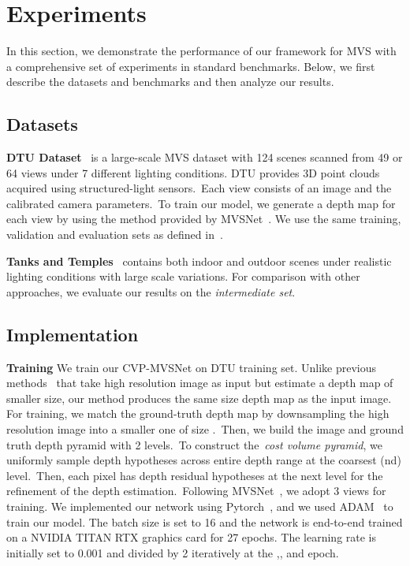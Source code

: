 \section{Experiments}
In this section, we demonstrate the performance of our framework for MVS with a comprehensive set of experiments in standard benchmarks. Below, we first describe the datasets and benchmarks and then analyze our results.
\subsection{Datasets}
 \noindent\textbf{DTU Dataset}~\cite{aanaes2016large} is a large-scale MVS dataset with 124 scenes scanned from 49 or 64 views under 7 different lighting conditions. DTU provides 3D point clouds acquired using structured-light sensors.~Each view consists of an image and the calibrated camera parameters.~To train our model, we generate a  depth map for each view by using the method provided by MVSNet~\cite{yao2018mvsnet}. We use the same training, validation and evaluation sets as defined in~\cite{yao2018mvsnet,yao2019recurrent}.
 
 \noindent\textbf{Tanks and Temples}~\cite{knapitsch2017tanks} contains both indoor and outdoor scenes under realistic lighting conditions with large scale variations. For comparison with other approaches, we evaluate our results on the \emph{intermediate set}.
\subsection{Implementation}
\noindent\textbf{Training} We train our CVP-MVSNet on DTU training set.  
 Unlike previous methods~\cite{yao2018mvsnet,yao2019recurrent} that take high resolution image as input but estimate a depth map of smaller size, our method produces the same size depth map as the input image.
 For training, we match the ground-truth depth map by downsampling the high resolution image into a smaller one of size .~Then, we build the image and ground truth depth pyramid with 2 levels.~To construct the~\emph{cost volume pyramid}, we uniformly sample  depth hypotheses across entire depth range at the coarsest (nd) level.~Then, each pixel has  depth residual hypotheses at the next level for the refinement of the depth estimation.~Following MVSNet~\cite{yao2018mvsnet}, we adopt 3 views for training. We implemented our network using Pytorch~\cite{paszke2017automatic}, and we used ADAM~\cite{kingma2014adam} to train our model. The batch size is set to 16 and the network is end-to-end trained on a NVIDIA TITAN RTX graphics card for 27 epochs. The learning rate is initially set to 0.001 and divided by 2 iteratively at the ,, and  epoch.

